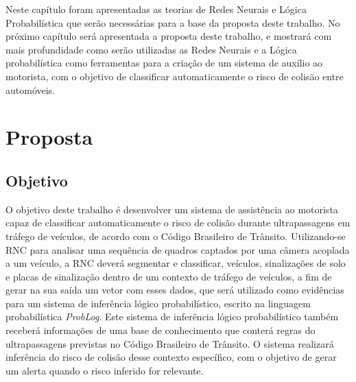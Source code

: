 \documentclass[
	12pt,				%
    oneside,			%
	a4paper,			%
	english,			%
	french,				%
	spanish,			%
	brazil,				%
	]{abntex2}
\begin{document}
Neste capítulo foram apresentadas as teorias de Redes Neurais e Lógica Probabilística que serão necessárias para a base da proposta deste trabalho. No próximo capítulo será apresentada a proposta deste trabalho, e mostrará com mais profundidade como serão utilizadas as Redes Neurais e a Lógica probabilística como ferramentas para a criação de um sistema de auxílio ao motorista, com o objetivo de classificar automaticamente o risco de colisão entre automóveis.










\chapter {Proposta}

\section {Objetivo}
O objetivo deste trabalho é desenvolver um sistema de assistência ao motorista capaz de classificar automaticamente o risco de colisão durante ultrapassagens em tráfego de veículos, de acordo com o Código Brasileiro de Trânsito. Utilizando-se RNC para analisar uma sequência de quadros captados por uma câmera acoplada a um veículo, a RNC deverá segmentar e classificar, veículos, sinalizações de solo e placas de sinalização dentro de um contexto de tráfego de veículos, a fim de gerar na sua saída um vetor com esses dados, que será utilizado como evidências para um sistema de inferência lógico probabilístico, escrito na linguagem probabilística \textit{ProbLog}. Este sistema de inferência lógico probabilístico também receberá informações de uma base de conhecimento que conterá regras do ultrapassagens previstas no Código Brasileiro de Trânsito. O sistema realizará inferência do risco de colisão desse contexto específico, com o objetivo de gerar um alerta quando o risco inferido for relevante.
\end{document}
